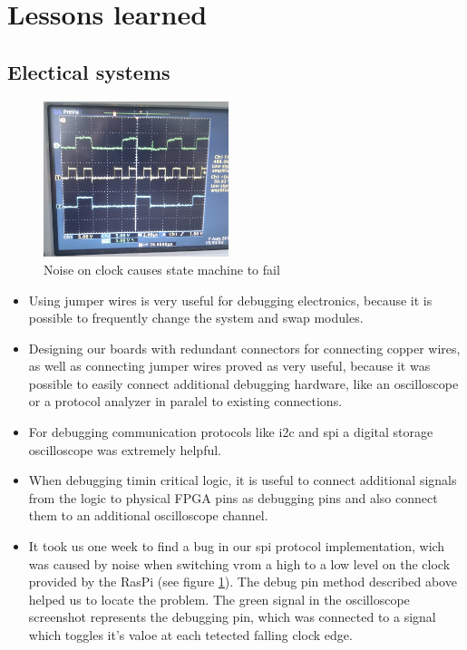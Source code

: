 \documentclass[a4paper
               ,10pt
               ,DIV=10 %
               ,BCOR=0.3cm
               ,pagesize %
               ,headings=small
               ,bibtotoc
               ]
               {scrartcl}
\begin{document}
\section{Lessons learned}
\subsection{Electical systems}
\begin{figure}
\includegraphics[width=0.48\textwidth]{pic/spi.png}
\caption{Noise on clock causes state machine to fail}
\label{fignoise}
\end{figure}
\begin{itemize}
  \item Using jumper wires is very useful for debugging electronics, because it is possible to frequently change the system and swap modules.
  \item Designing our boards with redundant connectors for connecting copper wires, as well as connecting jumper wires proved as very useful, because it was possible to easily connect additional debugging hardware, like an oscilloscope or a protocol analyzer in paralel to existing connections.
  \item For debugging communication protocols like i2c and spi a digital storage oscilloscope was extremely helpful.
  \item When debugging timin critical logic, it is useful to connect additional signals from the logic to physical FPGA pins as debugging pins and also connect them to an additional oscilloscope channel.
  \item It took us one week to find a bug in our spi protocol implementation, wich was caused by noise when switching vrom a high to a low level on the clock provided by the RasPi (see figure \ref{fignoise}). The debug pin method described above helped us to locate the problem. The green signal in the oscilloscope screenshot represents the debugging pin, which was connected to a signal which toggles it's valoe at each tetected falling clock edge.
\end{itemize}
\end{document}
